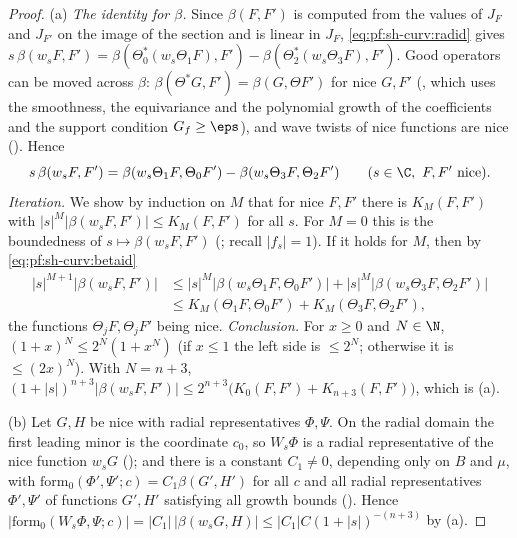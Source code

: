 \begin{proof}
(a) \emph{The identity for $\beta$.} Since $\beta(F,F')$ is computed from the values of $J_F$ and $J_{F'}$ on the image of the
section and is linear in $J_F$, \eqref{eq:pf:sh-curv:radid} gives
$s\,\beta(w_sF,F')=\beta(\Theta_0^*(w_s\Theta_1F),F')-\beta(\Theta_2^*(w_s\Theta_3F),F')$. Good operators can be moved across
$\beta$: $\beta(\Theta^*G,F')=\beta(G,\Theta F')$ for nice $G,F'$ (, which
uses the smoothness, the equivariance and the polynomial growth of the coefficients and the support condition
$G_f\ge\eps$), and wave twists of nice functions are nice
(). Hence
\begin{equation}\label{eq:pf:sh-curv:betaid}
s\,\beta(w_sF,F')=\beta(w_s\Theta_1F,\Theta_0F')-\beta(w_s\Theta_3F,\Theta_2F')\qquad(s\in\C,\ F,F'\text{ nice}).
\end{equation}
\emph{Iteration.} We show by induction on $M$ that for nice $F,F'$ there is $K_M(F,F')$ with
$|s|^M|\beta(w_sF,F')|\le K_M(F,F')$ for all $s$. For $M=0$ this is the boundedness of $s\mapsto\beta(w_sF,F')$
(; recall $|f_s|=1$). If it holds for $M$, then by
\eqref{eq:pf:sh-curv:betaid}
\begin{align*}
|s|^{M+1}|\beta(w_sF,F')|&\le|s|^M|\beta(w_s\Theta_1F,\Theta_0F')|+|s|^M|\beta(w_s\Theta_3F,\Theta_2F')|\\
&\le K_M(\Theta_1F,\Theta_0F')+K_M(\Theta_3F,\Theta_2F'),
\end{align*}
the functions $\Theta_jF,\Theta_jF'$ being nice. \emph{Conclusion.} For $x\ge0$ and $N\in\N$, $(1+x)^N\le2^N(1+x^N)$ (if $x\le1$
the left side is $\le2^N$; otherwise it is $\le(2x)^N$). With $N=n+3$,
$(1+|s|)^{n+3}|\beta(w_sF,F')|\le2^{n+3}\bigl(K_0(F,F')+K_{n+3}(F,F')\bigr)$, which is (a).

(b) Let $G,H$ be nice with radial representatives $\Phi,\Psi$. On the radial domain the first leading minor is the coordinate
$c_0$, so $W_s\Phi$ is a radial representative of the nice function $w_sG$
(); and there is a constant $C_1\ne0$, depending only on $B$
and $\mu$, with $\mathrm{form}_0(\Phi',\Psi';c)=C_1\beta(G',H')$ for all $c$ and all radial representatives $\Phi',\Psi'$ of
functions $G',H'$ satisfying all growth bounds (). Hence
$|\mathrm{form}_0(W_s\Phi,\Psi;c)|=|C_1|\,|\beta(w_sG,H)|\le|C_1|C(1+|s|)^{-(n+3)}$ by (a).
\end{proof}

